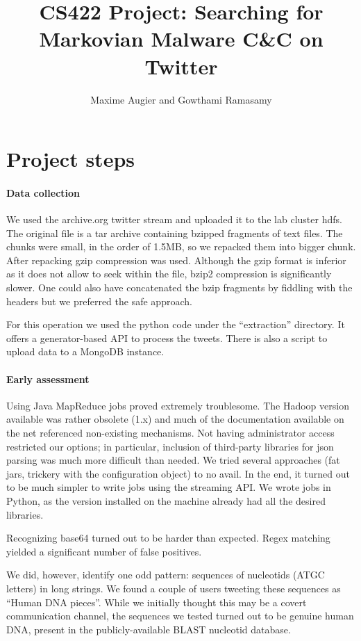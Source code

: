 \documentclass[a4paper,11pt]{article}
\title{CS422 Project: Searching for Markovian Malware C\&C on Twitter}
\author{Maxime Augier and Gowthami Ramasamy}
\begin{document}
\maketitle



\section{Project steps}

\paragraph{Data collection}

We used the archive.org twitter stream and uploaded it to the lab cluster hdfs. The original file is a tar archive containing bzipped fragments of text files. The chunks were small, in the order of 1.5MB, so we repacked them into bigger chunk. After repacking gzip compression was used. Although the gzip format is inferior as it does not allow to seek within the file, bzip2 compression is significantly slower. One could also have concatenated the bzip fragments by fiddling with the headers but we preferred the safe approach.

For this operation we used the python code under the ``extraction'' directory. It offers a generator-based API to process the tweets. There is also a script to upload data to a MongoDB instance.

\paragraph{Early assessment}

Using Java MapReduce jobs proved extremely troublesome. The Hadoop version available was rather obsolete (1.x) and much of the documentation available on the net referenced non-existing mechanisms. Not having administrator access restricted our options; in particular, inclusion of third-party libraries for json parsing was much more difficult than needed. We tried several approaches (fat jars, trickery with the configuration object) to no avail. In the end, it turned out to be much simpler to write jobs using the streaming API. We wrote jobs in Python, as the version installed on the machine already had all the desired libraries.

Recognizing base64 turned out to be harder than expected. Regex matching yielded a significant number of false positives.

We did, however, identify one odd pattern: sequences of nucleotids (ATGC letters) in long strings. We found a couple of users tweeting these sequences as ``Human DNA pieces''. While we initially thought this may be a covert communication channel, the sequences we tested turned out to be genuine human DNA, present in the publicly-available BLAST nucleotid database.
\end{document}
